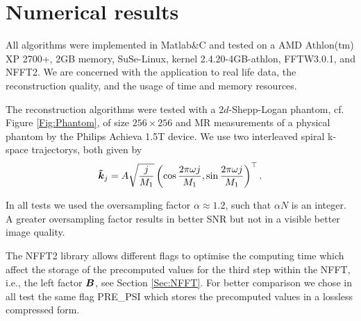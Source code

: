 \documentclass[journal]{IEEEtran}
\newcommand{\zb}[1]{\mbox{\boldmath{${#1}$}}}
\numberwithin{equation}{section}
\numberwithin{table}{section}
\numberwithin{figure}{section}
\begin{document}
\section{Numerical results}\label{Sec:Num}
All algorithms were implemented in Matlab\&C and tested on a AMD Athlon(tm) XP
2700+, 2GB memory, SuSe-Linux, kernel 2.4.20-4GB-athlon, FFTW3.0.1, and NFFT2.
We are concerned with the application to real life data, the reconstruction
quality, and the usage of time and memory resources.

The reconstruction algorithms were tested with a $2d$-Shepp-Logan phantom, cf. Figure \ref{Fig:Phantom}, of size $256\times256$ and MR measurements of a physical phantom by the Philips Achieva 1.5T device. We use two interleaved spiral k-space trajectorys, both given by
\begin{equation*}
\zb {\tilde k}_j = A \sqrt{\frac{j}{M_1}} \left(\cos\frac{2\pi \omega
    j}{M_1}, \sin\frac{2\pi \omega j}{M_1}\right)^{\top}. 
\end{equation*}


In all tests we used the oversampling factor $\alpha \approx 1.2$, such that $\alpha N$ is an integer. A greater oversampling factor results in better SNR but not in a visible better image quality. 

The NFFT2 library allows different flags to optimise the computing time which
affect the storage of the precomputed values for the third step within the
NFFT, i.e., the left factor $\zb B$, see Section \ref{Sec:NFFT}. For better comparison we chose in all test the same
flag PRE\_PSI which stores the precomputed values in a lossless compressed form.

\end{document}
